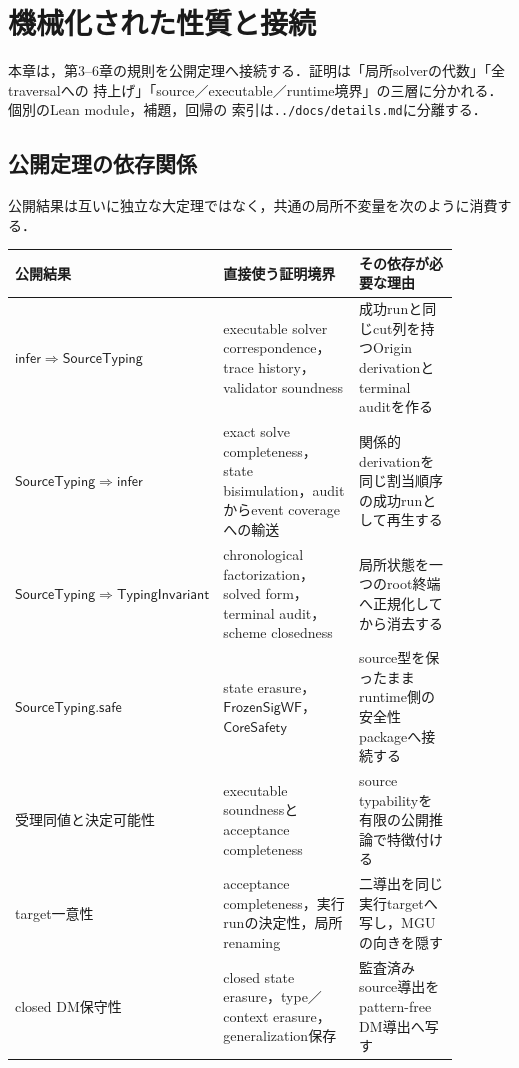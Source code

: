 \section{機械化された性質と接続}

本章は，第3--6章の規則を公開定理へ接続する．証明は「局所solverの代数」「全traversalへの
持上げ」「source／executable／runtime境界」の三層に分かれる．個別のLean module，補題，回帰の
索引は\texttt{../docs/details.md}に分離する．

\subsection{公開定理の依存関係}

公開結果は互いに独立な大定理ではなく，共通の局所不変量を次のように消費する．

\begin{center}
\small
\begin{tabular}{p{0.25\linewidth}p{0.34\linewidth}p{0.29\linewidth}}
\toprule
公開結果 & 直接使う証明境界 & その依存が必要な理由 \\
\midrule
$\mathsf{infer}\Rightarrow\mathsf{SourceTyping}$
  & executable solver correspondence，trace history，validator soundness
  & 成功runと同じcut列を持つOrigin derivationとterminal auditを作る \\
$\mathsf{SourceTyping}\Rightarrow\mathsf{infer}$
  & exact solve completeness，state bisimulation，auditからevent coverageへの輸送
  & 関係的derivationを同じ割当順序の成功runとして再生する \\
$\mathsf{SourceTyping}\Rightarrow\mathsf{TypingInvariant}$
  & chronological factorization，solved form，terminal audit，scheme closedness
  & 局所状態を一つのroot終端へ正規化してから消去する \\
$\mathsf{SourceTyping.safe}$
  & state erasure，$\mathsf{FrozenSigWF}$，$\mathsf{CoreSafety}$
  & source型を保ったままruntime側の安全性packageへ接続する \\
受理同値と決定可能性
  & executable soundnessとacceptance completeness
  & source typabilityを有限の公開推論で特徴付ける \\
target一意性
  & acceptance completeness，実行runの決定性，局所renaming
  & 二導出を同じ実行targetへ写し，MGUの向きを隠す \\
closed DM保守性
  & closed state erasure，type／context erasure，generalization保存
  & 監査済みsource導出をpattern-free DM導出へ写す \\
\bottomrule
\end{tabular}
\end{center}

